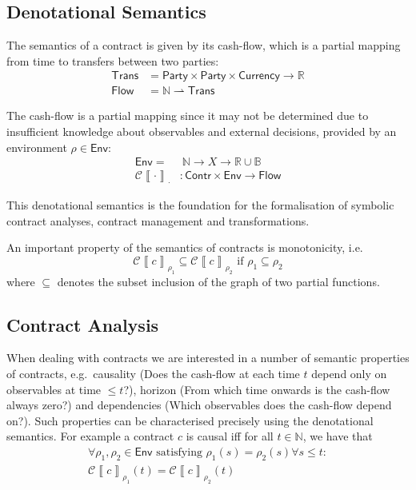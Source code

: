 \documentclass[a4paper,debug,twocolumn]{easychair}
\newcommand\type[1]{\mathsf{#1}}
\newcommand\reals{{\mathbb R}}
\newcommand\nats{{\mathbb N}}
\newcommand\bools{{\mathbb B}}
\newcommand\pto{\rightharpoonup}
\newcommand\cSem[2]{{\mathcal C}\left\llbracket#1\right\rrbracket_{#2}}
\theoremstyle{plain}
\begin{document}
\subsection{Denotational Semantics}
\label{sec:semantics}

The semantics of a contract is given by its cash-flow, which is a
partial mapping from time to transfers between two parties:
\begin{align*}
  \type{Trans} &= \type{Party} \times \type{Party} \times
  \type{Currency} \to \reals\\
  \type{Flow} &= \nats \pto \type{Trans}
\end{align*}

The cash-flow is a partial mapping since it may not be determined due
to insufficient knowledge about observables and external decisions,
provided by an environment $\rho\in\type{Env}$:
\begin{align*}
  \type{Env} = &\ \nats \to X \to  \reals \cup \bools\\
  \cSem{\cdot}{\cdot}&\colon \type{Contr} \times \type{Env} \to
  \type{Flow}
\end{align*}

This denotational semantics is the foundation for the formalisation of
symbolic contract analyses, contract management and %
transformations.

An important property of the semantics of contracts is monotonicity,
i.e.
\[
\cSem c {\rho_1} \subseteq \cSem c {\rho_2} \text{ if }
\rho_1\subseteq \rho_2
\]
where $\subseteq$ denotes the subset inclusion of the graph of two
partial functions.

\subsection{Contract Analysis}
\label{sec:contract-analysis}

When dealing with contracts we are interested in a number of semantic
properties of contracts, e.g.\ causality (Does the cash-flow at each
time $t$ depend only on observables at time $\leq t$?), horizon (From
which time onwards is the cash-flow always zero?) and dependencies
(Which observables does the cash-flow depend on?). Such properties can
be characterised precisely using the denotational semantics. For
example a contract $c$ is causal iff for all $t \in \nats$, we have
that
\begin{align*}
\forall \rho_1, \rho_2 \in \type{Env} \text{ satisfying } 
\rho_1(s)=\rho_2(s) \forall s \le t:\\
%
\cSem c{\rho_1} (t) = \cSem c {\rho_2} (t)
\end{align*}
\end{document}
